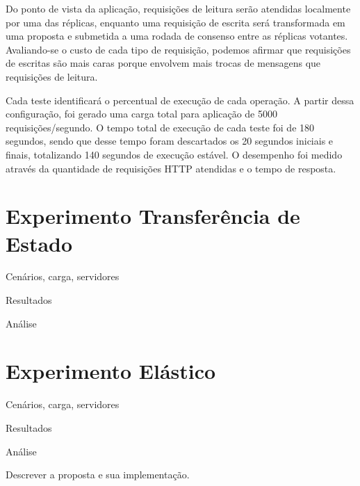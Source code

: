 Do ponto de vista da aplicação, requisições de leitura serão atendidas localmente por uma
das réplicas, enquanto uma requisição de escrita será transformada em uma proposta e
submetida a uma rodada de consenso entre as réplicas votantes. Avaliando-se o custo de
cada tipo de requisição, podemos afirmar que requisições de escritas são mais caras porque
envolvem mais trocas de mensagens que requisições de leitura.

Cada teste identificará o percentual de execução de cada operação. A partir dessa
configuração, foi gerado uma carga total para aplicação de 5000 requisições/segundo. O
tempo total de execução de cada teste foi de 180 segundos, sendo que desse tempo foram
descartados os 20 segundos iniciais e finais, totalizando 140 segundos de execução
estável. O desempenho foi medido através da quantidade de requisições HTTP atendidas e o
tempo de resposta.

\section{Experimento Transferência de Estado}\label{sec:experimento_tranferencia_estado}


Cenários, carga, servidores

Resultados

Análise

\section{Experimento Elástico}\label{sec:experimento:replicas_leitoras}

Cenários, carga, servidores

Resultados

Análise


Descrever a proposta e sua implementação.

